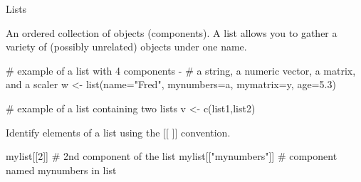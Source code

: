 \documentclass[
  10pt,
  ignorenonframetext,
]{beamer}
\newenvironment{Shaded}{\begin{snugshade}}{\end{snugshade}}
\newcommand{\CommentTok}[1]{\textcolor[rgb]{0.50,0.62,0.50}{#1}}
\newcommand{\DataTypeTok}[1]{\textcolor[rgb]{0.87,0.87,0.75}{#1}}
\newcommand{\DecValTok}[1]{\textcolor[rgb]{0.86,0.86,0.80}{#1}}
\newcommand{\FloatTok}[1]{\textcolor[rgb]{0.75,0.75,0.82}{#1}}
\newcommand{\KeywordTok}[1]{\textcolor[rgb]{0.94,0.87,0.69}{#1}}
\newcommand{\NormalTok}[1]{\textcolor[rgb]{0.80,0.80,0.80}{#1}}
\newcommand{\StringTok}[1]{\textcolor[rgb]{0.80,0.58,0.58}{#1}}
\begin{document}
\begin{frame}[fragile]{Lists}
\protect\hypertarget{lists}{}

An ordered collection of objects (components). A list allows you to
gather a variety of (possibly unrelated) objects under one name.

\begin{Shaded}
\begin{Highlighting}[]
\CommentTok{# example of a list with 4 components -}
\CommentTok{# a string, a numeric vector, a matrix, and a scaler}
\NormalTok{w <-}\StringTok{ }\KeywordTok{list}\NormalTok{(}\DataTypeTok{name=}\StringTok{"Fred"}\NormalTok{, }\DataTypeTok{mynumbers=}\NormalTok{a, }\DataTypeTok{mymatrix=}\NormalTok{y, }\DataTypeTok{age=}\FloatTok{5.3}\NormalTok{)}

\CommentTok{# example of a list containing two lists}
\NormalTok{v <-}\StringTok{ }\KeywordTok{c}\NormalTok{(list1,list2)}
\end{Highlighting}
\end{Shaded}

Identify elements of a list using the {[}{[} {]}{]} convention.

\begin{Shaded}
\begin{Highlighting}[]
\NormalTok{mylist[[}\DecValTok{2}\NormalTok{]] }\CommentTok{# 2nd component of the list}
\NormalTok{mylist[[}\StringTok{"mynumbers"}\NormalTok{]] }\CommentTok{# component named mynumbers in list}
\end{Highlighting}
\end{Shaded}

\end{frame}
\end{document}
